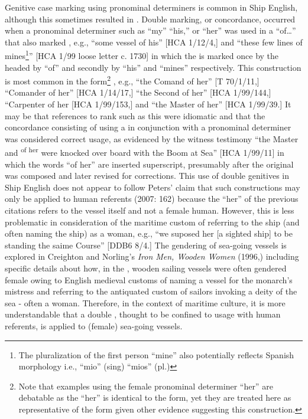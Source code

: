 Genitive case marking using  pronominal determiners is common in Ship English, although this sometimes resulted in . Double  marking, or  concordance, occurred when a pronominal  determiner such as “my” “his,” or “her” was used in a  “of…” that also marked , e.g., “some vessel of his” [HCA 1/12/4,] and “these few lines of mines\footnote{The pluralization of the first person   “mine” also potentially reflects Spanish morphology i.e., “mio” (sing) “mios” (pl.)}” [HCA 1/99 loose letter c. 1730] in which the  is marked once by the  headed by “of” and secondly by “his” and “mines” respectively. This construction is most common in the  form\footnote{Note that examples using the female   pronominal determiner “her” are debatable as the  “her” is identical to the  form, yet they are treated here as representative of the  form given other evidence suggesting this construction.} , e.g., “the Comand of her” [T 70/1/11,] “Comander of her” [HCA 1/14/17,] “the Second  of her” [HCA 1/99/144,] “Carpenter of her [HCA 1/99/153,] and “the Master of her” [HCA 1/99/39.] It may be that references to rank such as this were idiomatic and that the  concordance consisting of using a  in conjunction with a  pronominal determiner was considered correct usage, as evidenced by the witness testimony “the Master and  \textsuperscript{of her} were knocked over board with the Boom at Sea” [HCA 1/99/11] in which the words “of her” are inserted superscript, presumably after the original was composed and later revised for corrections.  This use of double genitives in Ship English does not appear to follow Peters’ claim that such constructions may only be applied to human referents (2007: 162) because the “her” of the previous citations refers to the vessel itself and not a female human. However, this is less problematic in consideration of the maritime custom of referring to the ship (and often naming the ship) as a woman, e.g., “we suposed her [a sighted ship] to be standing the saime Course” [DDB6 8/4.] The gendering of sea-going vessels is explored in Creighton and Norling’s \textit{Iron Men, Wooden Women} (1996,) including specific details about how, in the , wooden sailing vessels were often gendered female owing to English medieval customs of naming a vessel for the monarch’s mistress and referring to the antiquated custom of sailors invoking a deity of the sea - often a woman. Therefore, in the context of maritime culture, it is more understandable that a double , thought to be confined to usage with human referents, is applied to (female) sea-going vessels. 

